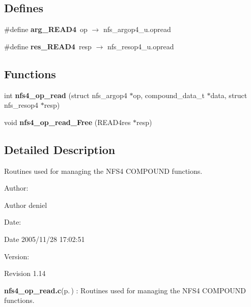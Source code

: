 \subsection*{Defines}
\begin{CompactItemize}
\item 
\#define {\bf arg\_\-READ4}\ op $\rightarrow$ nfs\_\-argop4\_\-u.opread
\item 
\#define {\bf res\_\-READ4}\ resp $\rightarrow$ nfs\_\-resop4\_\-u.opread
\end{CompactItemize}
\subsection*{Functions}
\begin{CompactItemize}
\item 
int {\bf nfs4\_\-op\_\-read} (struct nfs\_\-argop4 $\ast$op, compound\_\-data\_\-t $\ast$data, struct nfs\_\-resop4 $\ast$resp)
\item 
void {\bf nfs4\_\-op\_\-read\_\-Free} (READ4res $\ast$resp)
\end{CompactItemize}


\subsection{Detailed Description}
Routines used for managing the NFS4 COMPOUND functions. 

\begin{Desc}
\item[Author:]\begin{Desc}
\item[Author]deniel \end{Desc}
\end{Desc}
\begin{Desc}
\item[Date:]\begin{Desc}
\item[Date]2005/11/28 17:02:51 \end{Desc}
\end{Desc}
\begin{Desc}
\item[Version:]\begin{Desc}
\item[Revision]1.14 \end{Desc}
\end{Desc}
{\bf nfs4\_\-op\_\-read.c}{\rm (p.\,\pageref{nfs4__op__read_8c})} : Routines used for managing the NFS4 COMPOUND functions.

